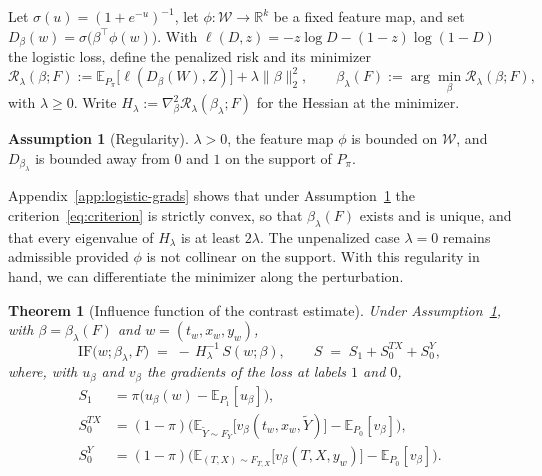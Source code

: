 \documentclass[11pt]{article}
\theoremstyle{plain}
\newtheorem{theorem}{Theorem}
\theoremstyle{definition}
\newtheorem{assumption}{Assumption}
\theoremstyle{remark}
\newcommand{\pE}{\ensuremath{\mathbb{E}}}
\newcommand{\R}{\mathbb{R}}
\newcommand{\cW}{\ensuremath{\mathcal{W}}}
\newcommand{\cR}{\ensuremath{\mathcal{R}}}
\newcommand{\ratio}{\ensuremath{\pi}}
\newcommand{\ks}{k}
\newcommand{\IF}{\mathrm{IF}}
\newcommand{\score}{S}
\begin{document}
Let $\sigma(u) = (1+e^{-u})^{-1}$, let $\phi : \cW \to \R^{\ks}$ be a fixed feature map, and
set $D_\beta(w) = \sigma\big(\beta^\top \phi(w)\big)$. With
$\ell(D,z) = -z\log D - (1-z)\log(1-D)$ the logistic loss, define the penalized risk and its
minimizer
\begin{equation}
\cR_\lambda(\beta;F) := \pE_{P_\ratio}\big[\ell(D_\beta(W),Z)\big]
+ \lambda \|\beta\|_2^2 ,
\qquad
\beta_\lambda(F) := \arg\min_{\beta} \cR_\lambda(\beta;F),
\label{eq:criterion}
\end{equation}
with $\lambda \ge 0$. Write $H_\lambda := \nabla^2_\beta \cR_\lambda(\beta_\lambda;F)$ for the
Hessian at the minimizer.

\begin{assumption}[Regularity]
\label{as:smooth}
$\lambda > 0$, the feature map $\phi$ is bounded on $\cW$, and $D_{\beta_\lambda}$ is bounded
away from $0$ and $1$ on the support of $P_\ratio$.
\end{assumption}

Appendix~\ref{app:logistic-grads} shows that under Assumption~\ref{as:smooth} the
criterion~\eqref{eq:criterion} is strictly convex, so that $\beta_\lambda(F)$ exists and is
unique, and that every eigenvalue of $H_\lambda$ is at least $2\lambda$. The unpenalized case
$\lambda = 0$ remains admissible provided $\phi$ is not collinear on the support. With this
regularity in hand, we can differentiate the minimizer along the perturbation.

\begin{theorem}[Influence function of the contrast estimate]
\label{thm:channels}
Under Assumption~\ref{as:smooth}, with $\beta = \beta_\lambda(F)$ and $w = (t_w,x_w,y_w)$,
\begin{equation}
\IF\big(w;\beta_\lambda,F\big) \;=\; -\,H_\lambda^{-1}\,\score(w;\beta),
\qquad
\score \;=\; \score_1 + \score_0^{TX} + \score_0^{Y},
\label{eq:master}
\end{equation}
where, with $u_\beta$ and $v_\beta$ the gradients of the loss at labels $1$ and $0$,
\begin{equation}
\begin{aligned}
\score_1 &= \ratio\Big( u_\beta(w) - \pE_{P_1}[u_\beta] \Big), \\
\score_0^{TX} &= (1-\ratio)\Big(
\pE_{\widetilde Y \sim F_Y}\big[ v_\beta(t_w,x_w,\widetilde Y) \big]
- \pE_{P_0}[v_\beta] \Big), \\
\score_0^{Y} &= (1-\ratio)\Big(
\pE_{(T,X) \sim F_{T,X}}\big[ v_\beta(T,X,y_w) \big]
- \pE_{P_0}[v_\beta] \Big).
\end{aligned}
\label{eq:channels}
\end{equation}
\end{theorem}
\end{document}

